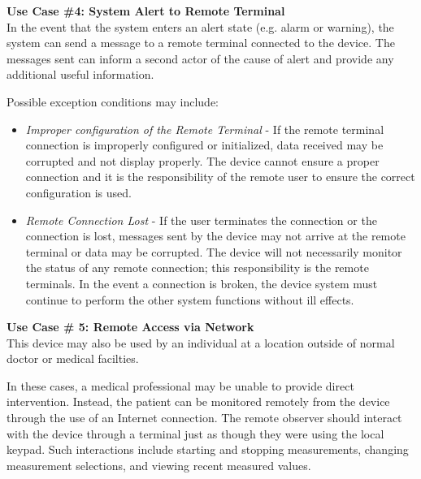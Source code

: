 \documentclass[12pt]{article} %
\begin{document}
\textbf{Use Case \#4: System Alert to Remote Terminal}\\
In the event that the system enters an alert state (e.g. alarm or warning), the
system can send a message to a remote terminal connected to the device. The
messages sent can inform a second actor of the cause of alert and provide any
additional useful information.

Possible exception conditions may include:
\begin{itemize}
  \item \emph{Improper configuration of the Remote Terminal} - If the remote
    terminal connection is improperly configured or initialized, data received
    may be corrupted and not display properly. The device cannot ensure a
    proper connection and it is the responsibility of the remote user to ensure
    the correct configuration is used.
  \item \emph{Remote Connection Lost} - If the user terminates the connection
    or the connection is lost, messages sent by the device may not arrive at
    the remote terminal or data may be corrupted. The device will not
    necessarily monitor the status of any remote connection; this
    responsibility is the remote terminals. In the event a connection is
    broken, the device system must continue to perform the other system
    functions without ill effects.
\end{itemize}

\textbf{Use Case \# 5: Remote Access via Network} \\
This device may also be used by an individual at a location outside of normal
doctor or medical facilties.

In these cases, a medical professional may be unable to provide direct
intervention. Instead, the patient can be monitored remotely from the device
through the use of an Internet connection. The remote observer should interact
with the device through a terminal just as though they were using the local
keypad. Such interactions include starting and stopping measurements, changing
measurement selections, and viewing recent measured values.
\end{document}
